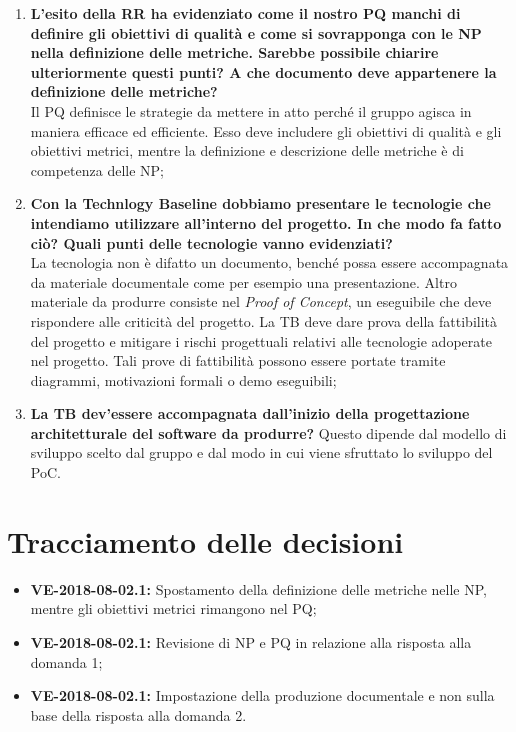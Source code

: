 \documentclass[openany,12pt,a4paper]{article}
\begin{document}
  \begin{enumerate}
  	\item \textbf{L'esito della RR ha evidenziato come il nostro PQ manchi di definire gli obiettivi di qualità e come si sovrapponga con le NP nella definizione delle metriche. Sarebbe possibile chiarire ulteriormente questi punti? A che documento deve appartenere la definizione delle metriche?} \\
  	Il PQ definisce le strategie da mettere in atto perché il gruppo agisca in maniera efficace ed efficiente. Esso deve includere gli obiettivi di qualità e gli obiettivi metrici, mentre la definizione e descrizione delle metriche è di competenza delle NP;
  	\item \textbf{Con la Technlogy Baseline dobbiamo presentare le tecnologie che intendiamo utilizzare all'interno del progetto. In che modo fa fatto ciò? Quali punti delle tecnologie vanno evidenziati?} \\
  	La tecnologia non è difatto un documento, benché possa essere accompagnata da materiale documentale come per esempio una presentazione. Altro materiale da produrre consiste nel \textit{Proof of Concept}, un eseguibile che deve rispondere alle criticità del progetto. La TB deve dare prova della fattibilità del progetto e mitigare i rischi progettuali relativi alle tecnologie adoperate nel progetto. Tali prove di fattibilità possono essere portate tramite diagrammi, motivazioni formali o demo eseguibili;
  	\item \textbf{La TB dev'essere accompagnata dall'inizio della progettazione architetturale del software da produrre?}
  	Questo dipende dal modello di sviluppo scelto dal gruppo e dal modo in cui viene sfruttato lo sviluppo del PoC.
  \end{enumerate} 
 
  \section{Tracciamento delle decisioni} 
   
  \begin{itemize} 
      \item \textbf{VE-2018-08-02.1:} Spostamento della definizione delle metriche nelle NP, mentre gli obiettivi metrici rimangono nel PQ; 
      \item \textbf{VE-2018-08-02.1:} Revisione di NP e PQ in relazione alla risposta alla domanda 1;
      \item \textbf{VE-2018-08-02.1:} Impostazione della produzione documentale e non sulla base della risposta alla domanda 2.
  \end{itemize} 
   
  
\end{document}
